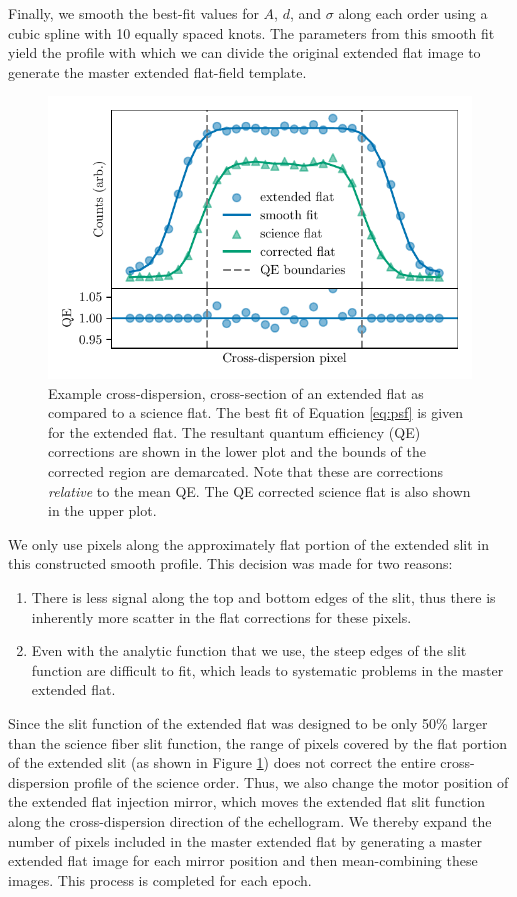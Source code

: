Finally, we smooth the best-fit values for $A$, $d$, and $\sigma$ along each order using a cubic spline with 10 equally spaced knots. The parameters from this smooth fit yield the profile with which we can divide the original extended flat image to generate the master extended flat-field template.

\begin{figure}
\centering
\includegraphics{figures-4/flats}
\caption[Extended flat quantum efficiency correction]{Example cross-dispersion, cross-section of an extended flat as compared to a science flat. The best fit of Equation \ref{eq:psf} is given for the extended flat. The resultant quantum efficiency (QE) corrections are shown in the lower plot and the bounds of the corrected region are demarcated. Note that these are corrections \textit{relative} to the mean QE. The QE corrected science flat is also shown in the upper plot.}\label{fig:flats}
\end{figure}

We only use pixels along the approximately flat portion of the extended slit in this constructed smooth profile. This decision was made for two reasons:
\begin{enumerate}
    \item There is less signal along the top and bottom edges of the slit, thus there is inherently more scatter in the flat corrections for these pixels.
    \item Even with the analytic function that we use, the steep edges of the slit function are difficult to fit, which leads to systematic problems in the master extended flat.
\end{enumerate}
Since the slit function of the extended flat was designed to be only 50\% larger than the science fiber slit function, the range of pixels covered by the flat portion of the extended slit (as shown in Figure \ref{fig:flats}) does not correct the entire cross-dispersion profile of the science order. Thus, we also change the motor position of the extended flat injection mirror, which moves the extended flat slit function along the cross-dispersion direction of the echellogram. We thereby expand the number of pixels included in the master extended flat by generating a master extended flat image for each mirror position and then mean-combining these images. This process is completed for each epoch.

